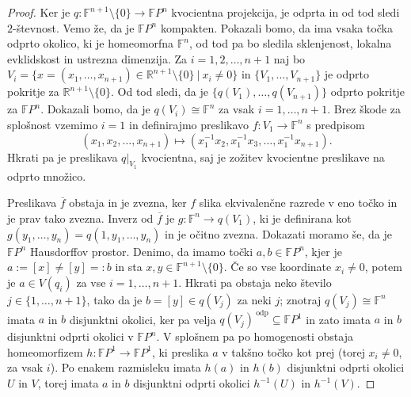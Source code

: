 \documentclass[10pt, a4paper]{article}
\newenvironment{noticeC}{%
  \tcolorbox[%
  notitle,
  empty,
  enhanced,  %
  breakable,
  coltext=black, 
  fontupper=\rmfamily,
  noparskip,
  sharp corners,
  boxrule=-1pt,  %
  frame hidden,
  left=7pt,  %
  right=7pt,
  top=5pt,
  bottom=5pt,
  before skip=2.5ex plus 2pt,
  after skip=2.5ex plus 2pt,
  overlay unbroken and last={%
  },
  ]}
{\endtcolorbox}
\newenvironment{dokaz}%
  {\begin{noticeC}\begin{proof}}%
  {\end{proof}\end{noticeC}}
\newcommand{\R}{\mathbb {R}}
\newcommand{\F}{\mathbb {F}}
\begin{document}
\begin{dokaz}
   Ker je $q: \F^{n + 1} \setminus \{0\} \to \F P^n$ kvocientna projekcija, je odprta in od tod sledi $2$-števnost.
   Vemo že, da je $\F P^n$ kompakten. Pokazali bomo, da ima vsaka točka odprto okolico,
   ki je homeomorfna $\F^n$, od tod pa bo sledila sklenjenost, lokalna evklidskost in ustrezna dimenzija.
   Za $i = 1, 2, \dots, n + 1$ naj bo $V_i = \{x = (x_1, \dots, x_{n +1}) \in \R^{n + 1} \setminus \{0\}\ |\ x_i \neq 0 \}$
   in $\{V_1, \dots, V_{n + 1}\}$ je odprto pokritje za $\R^{n + 1} \setminus \{0\}$.
   Od tod sledi, da je $\{q(V_1), \dots, q(V_{n + 1})\}$ odprto pokritje za $\F P^n$.
   Dokazali bomo, da je $q(V_i) \cong \F^n$ za vsak $i = 1, \dots, n + 1$.
   Brez škode za splošnost vzemimo $i = 1$ in definirajmo preslikavo $f: V_1 \to \F^n$
   s predpisom $$(x_1, x_2, \dots, x_{n+ 1}) \mapsto (x_1^{-1} x_2, x_1^{-1} x_3,\dots, x_1^{-1}x_{n + 1}).$$
   Hkrati pa je preslikava $q\big|_{V_1}$ kvocientna, saj je zožitev kvocientne preslikave na odprto množico.
   \begin{center}
    \adjustbox{scale=1.5,center}{
      \begin{tikzcd}
        V_1 \arrow[r, "f"] \arrow[d, "q |_{V_1}"']
          & \F^{n} \\
        q(V_1) \arrow[ur, dashed, "\overline{f}"']
          & 
      \end{tikzcd}
    }  
  \end{center} 
  Preslikava $\overline{f}$ obstaja in je zvezna, ker $f$ slika ekvivalenčne 
  razrede v eno točko in je prav tako zvezna.
  Inverz od $\overline{f}$ je $g:\F^{n} \to q(V_1)$, ki je definirana kot
  $g(y_1, \dots, y_n) = q(1, y_1, \dots, y_n)$ in je očitno zvezna.
  Dokazati moramo še, da je $\F P^n$ Hausdorffov prostor.
  Denimo, da imamo točki $a, b \in \F P^n$, kjer je $a := [x] \neq [y] =: b$
  in sta $x, y \in \F^{n + 1} \setminus \{0\}$.
  Če so vse koordinate $x_i \neq 0$, potem je $a \in V(q_i)$ za vse $i = 1, \dots, n + 1$.
  Hkrati pa obstaja neko število $j \in \{1, \dots, n + 1\}$, tako da je 
  $b = [y] \in q(V_j)$ za neki $j$; znotraj $q(V_j) \cong \F^n$ imata $a$ in $b$ disjunktni okolici, ker pa velja
  $q(V_j)^{\ \text{odp}} \subseteq \F P^1$ in zato imata $a$ in $b$ disjunktni odprti okolici v $\F P^n$.
  V splošnem pa po homogenosti obstaja homeomorfizem $h: \F P^1 \to \F P^1$,
  ki preslika $a$ v takšno točko kot prej (torej $x_i \neq 0$, za vsak $i$).
  Po enakem razmisleku imata $h(a)$ in $h(b)$ disjunktni odprti okolici $U$ in $V$,
  torej imata $a$ in $b$ disjunktni odprti okolici $h^{-1} (U)$ in $h^{-1} (V)$.
\end{dokaz}
\end{document}
